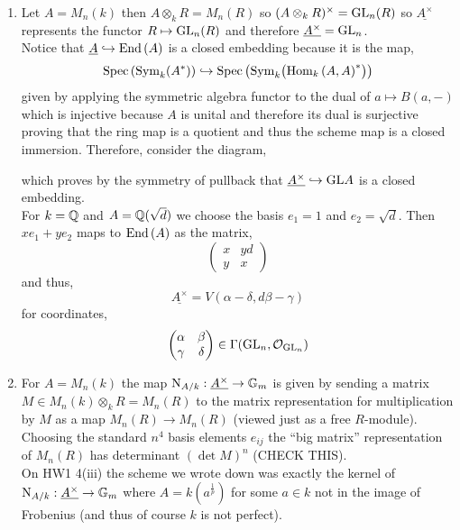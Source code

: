 \documentclass[12pt]{article}
\begin{document}
\begin{enumerate}
\item Let $A = M_n(k)$ then $A \otimes_k R = M_n(R)$ so $(A \otimes_k R)^\times = \mathrm{GL}_n(R)$ so $\underline{A^\times}$ represents the functor $R \mapsto \mathrm{GL}_n(R)$ and therefore $\underline{A^\times} = \mathrm{GL}_n$. 
\bigskip\\
Notice that $\underline{A} \hookrightarrow \mathrm{End}\left( A \right)$ is a closed embedding because it is the map,
\[ \mathrm{Spec}\left( \mathrm{Sym}_{k}\! \left( A^* \right) \right) \hookrightarrow \mathrm{Spec}\left( \mathrm{Sym}_{k}\! \left( \mathrm{Hom}_{k} \left( A, A \right)^* \right) \right) \]
given by applying the symmetric algebra functor to the dual of $a \mapsto B(a, -)$ which is injective because $A$ is unital and therefore its dual is surjective proving that the ring map is a quotient and thus the scheme map is a closed immersion. Therefore, consider the diagram,
\begin{center}
\end{center}
which proves by the symmetry of pullback that $\underline{A^\times} \hookrightarrow \mathrm{GL}{A}$ is a closed embedding.
\bigskip\\
For $k = \mathbb{Q}$ and $A = \mathbb{Q}(\sqrt{d})$ we choose the basis $e_1 = 1$ and $e_2 = \sqrt{d}$. Then $x e_1 + y e_2$ maps to $\mathrm{End}\left( A \right)$ as the matrix,
\[ \begin{pmatrix}
x & y d 
\\
y & x
\end{pmatrix} \]
and thus,
\[ \underline{A^\times} = V(\alpha - \delta, d \beta - \gamma) \]
for coordinates,
\[ \begin{pmatrix}
\alpha & \beta
\\
\gamma & \delta
\end{pmatrix} \in \Gamma(\mathrm{GL}_n, \mathcal{O}_{\mathrm{GL}_n}) \]

\item For $A = M_n(k)$ the map $\mathrm{N}_{A/k} : \underline{A^\times} \to {\mathbb{G}_m}$ is given by sending a matrix $M \in M_n(k) \otimes_k R = M_n(R)$ to the matrix representation for multiplication by $M$ as a map $M_n(R) \to M_n(R)$ (viewed just as a free $R$-module). Choosing the standard $n^4$ basis elements $e_{ij}$ the ``big matrix'' representation of $M_n(R)$ has determinant $(\det{M})^n$ (CHECK THIS).
\bigskip\\
On HW1 4(iii) the scheme we wrote down was exactly the kernel of $\mathrm{N}_{A/k} : \underline{A^\times} \to {\mathbb{G}_m}$ where $A = k(a^{\frac{1}{p}})$ for some $a \in k$ not in the image of Frobenius (and thus of course $k$ is not perfect). 
\end{enumerate}
\end{document}
